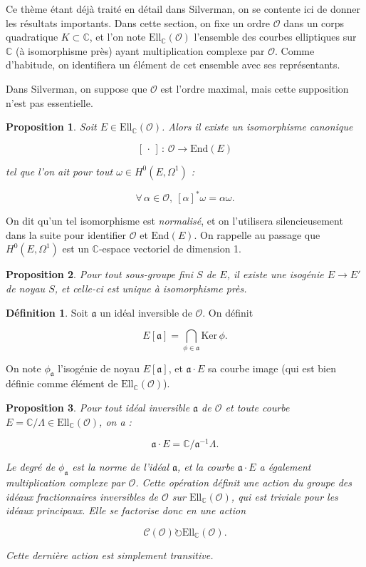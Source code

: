 \documentclass[11pt,a4paper]{article}
\newcommand{\C}{\mathbb{C}}
\renewcommand{\O}{\mathcal{O}}
\newcommand{\Cl}{\mathcal{C}}
\newcommand{\vers}{\longrightarrow}
\newcommand{\End}{\mathrm{End}}
\newcommand{\Ell}{\mathrm{Ell}}
\renewcommand{\frak}{\mathfrak}
\newcommand{\de}{\,:\,}
\newtheorem*{prop}{Proposition}
\theoremstyle{definition}
\newtheorem*{defi}{Définition}
\begin{document}
Ce thème étant déjà traité en détail dans Silverman, on se contente ici de donner les résultats importants. Dans cette section, on fixe un ordre $\O$ dans un corps quadratique $K\subset \C$, et l'on note $\Ell_\C(\O)$ l'ensemble des courbes elliptiques sur $\C$ (à isomorphisme près) ayant multiplication complexe par $\O$. Comme d'habitude, on identifiera un élément de cet ensemble avec ses représentants.

Dans Silverman, on suppose que $\O$ est l'ordre maximal, mais cette supposition n'est pas essentielle.

\begin{prop}

Soit $E\in \Ell_\C(\O)$. Alors il existe un isomorphisme canonique

$$[\,\cdot\,]\de \O\vers \End(E)$$

tel que l'on ait pour tout $\omega\in H^0(E,\Omega^1)$ :

$$\forall\,\alpha\in\O,\ [\alpha]^*\omega = \alpha \omega.$$

\end{prop}

On dit qu'un tel isomorphisme est \emph{normalisé}, et on l'utilisera silencieusement dans la suite pour identifier $\O$ et $\End(E)$. On rappelle au passage que $H^0(E,\Omega^1)$ est un $\C$-espace vectoriel de dimension 1.

\begin{prop}
Pour tout sous-groupe fini $S$ de $E$, il existe une isogénie $E\vers E'$ de noyau $S$, et celle-ci est unique à isomorphisme près.
\end{prop}

\begin{defi}
Soit $\frak a$ un idéal inversible de $\O$. On définit

$$E[\frak a]=\bigcap_{\phi\in \frak a} \mathrm{Ker}\,\phi.$$

On note $\phi_{\frak a}$ l'isogénie de noyau $E[\frak a]$, et $\frak a\cdot E$ sa courbe image (qui est bien définie comme élément de $\Ell_\C(\O)$).
\end{defi}

\begin{prop}

Pour tout idéal inversible $\frak a$ de $\O$ et toute courbe $E=\C/\Lambda\in \Ell_\C(\O)$, on a :

$$\frak a\cdot E = \C/\frak a^{-1} \Lambda.$$

Le degré de $\phi_{\frak a}$ est la norme de l'idéal $\frak a$, et la courbe $\frak a\cdot E$ a également multiplication complexe par $\O$. Cette opération définit une action du groupe des idéaux fractionnaires inversibles de $\O$ sur $\Ell_\C(\O)$, qui est triviale pour les idéaux principaux. Elle se factorise donc en une action

$$\Cl(\O) \circlearrowright \Ell_\C(\O).$$

Cette dernière action est simplement transitive.

\end{prop}
\end{document}
